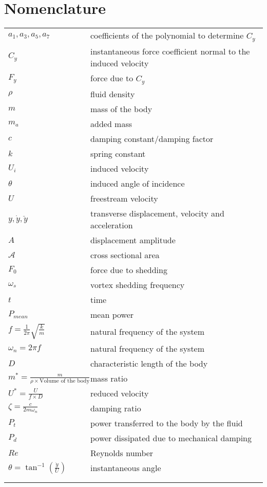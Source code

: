 \section*{Nomenclature}



\begin{tabular}{ll}
$a_1,a_3,a_5,a_7$ & coefficients of the polynomial to determine $C_y$ \\ 
$C_y$ & instantaneous force coefficient normal to the induced velocity \\
$F_y$ & force due to $C_y$  \\ 
$\rho$ & fluid density  \\
$m$ & mass of the body \\
$m_a$ & added mass \\
$c$ & damping constant/damping factor \\
$k$ & spring constant \\
$U_i$ & induced velocity \\
$\theta$ & induced angle of incidence \\
$U$ & freestream velocity \\
$y,\dot{y},\ddot{y}$ & transverse displacement, velocity and acceleration   \\
$A$ & displacement amplitude\\
$\mathcal{A}$ & cross sectional area\\ 
$F_0$& force due to shedding \\
$\omega_s$& vortex shedding frequency \\
$t$ & time \\
$P_{mean}$& mean power \\
$f=\frac{1}{2\pi}\sqrt{\frac{k}{m}}$& natural frequency of the system \\
$\omega_n= 2 \pi f$& natural frequency of the system  \\
$D$ & characteristic length of the body  \\
$m^*=\frac{m}{\rho \times \text{Volume of the body}}$& mass ratio \\
$U^*=\frac{U}{f \times D}$& reduced velocity  \\
$\zeta= \frac{c}{2 m \omega_n}$& damping ratio \\
$P_t$   & power transferred to the body by the fluid \\
$P_d$& power dissipated due to mechanical damping  \\
$Re$& Reynolds number  \\
$\theta= \tan^{-1}{(\frac{\dot{y}}{U})}$& instantaneous angle \\
& \\
& \\
\end{tabular}  